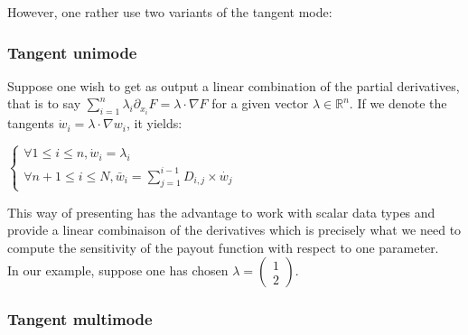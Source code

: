 \documentclass {article}
\begin{document}
			However, one rather use two variants of the tangent mode:
			
			\subsubsection{Tangent unimode}
					
				Suppose one wish to get as output a linear combination of the partial derivatives, that is to say 
				$\sum_{i=1}^{n} \lambda_{i} \partial_{x_{i}}F = \lambda \cdot \nabla F$ for a given vector 
				$\lambda \in \mathbb{R}^{n}$.
				If we denote the tangents $ \dot w_{i} = \lambda \cdot \nabla w_{i}$, it yields:
					
				\begin{center}
					$\begin{cases} \forall 1  \leq i \leq n, \dot w_{i} = \lambda_{i} \\ \forall n+1 \leq i \leq N, \bar w_{i} = \displaystyle{\sum_{j=1}^{i-1} {D_{i,j} \times \dot {w_{j}} } } \end{cases}$
				\end{center}
					
				This way of presenting has the advantage to work with scalar data types and provide a linear combinaison of the 
				derivatives which is precisely what we need to compute the sensitivity of the payout function with respect to one 
				parameter. \\
				In our example, suppose one has chosen $\lambda =  \begin{pmatrix} 1 \\ 2 \end{pmatrix}$.
				
				
			\subsubsection{Tangent multimode}				
			
\end{document}
